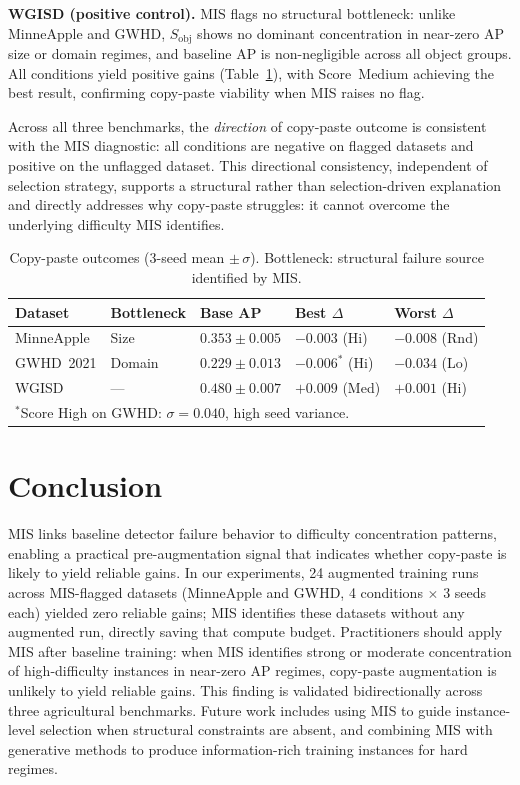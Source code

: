 \documentclass[conference]{IEEEtran}
\begin{document}
\textbf{WGISD (positive control).}
MIS flags no structural bottleneck: unlike MinneApple
and GWHD, $S_{\mathrm{obj}}$ shows no dominant
concentration in near-zero AP size or domain regimes,
and baseline AP is non-negligible across all object groups.
All conditions yield positive gains (Table~\ref{tab:outcomes}), 
with Score~Medium achieving
the best result, confirming copy-paste viability
when MIS raises no flag.

Across all three benchmarks, the \emph{direction} of
copy-paste outcome is consistent with the MIS diagnostic:
all conditions are negative on flagged datasets and
positive on the unflagged dataset.
This directional consistency, independent of selection
strategy, supports a structural rather than
selection-driven explanation and directly addresses
why copy-paste struggles: it cannot overcome the
underlying difficulty MIS identifies.

\begin{table}[t]
\centering
\caption{Copy-paste outcomes (3-seed mean $\pm\,\sigma$).
Bottleneck: structural failure source identified by MIS.}
\label{tab:outcomes}
\footnotesize
\setlength{\tabcolsep}{2.5pt}
\renewcommand{\arraystretch}{0.95}
\begin{tabular}{lllll}
\toprule
\textbf{Dataset}
  & \textbf{Bottleneck}
  & \textbf{Base AP}
  & \textbf{Best $\Delta$}
  & \textbf{Worst $\Delta$} \\
\midrule
MinneApple
  & Size
  & $0.353\pm0.005$
  & $-0.003$ (Hi)
  & $-0.008$ (Rnd) \\
GWHD~2021
  & Domain
  & $0.229\pm0.013$
  & $-0.006^{*}$ (Hi)
  & $-0.034$ (Lo) \\
WGISD
  & ---
  & $0.480\pm0.007$
  & $+0.009$ (Med)
  & $+0.001$ (Hi) \\
\bottomrule
\multicolumn{5}{l}{\scriptsize
  $^*$Score High on GWHD: $\sigma{=}0.040$, high seed variance.}
\end{tabular}
\end{table}


\section{Conclusion}

MIS links baseline detector failure behavior to difficulty 
concentration patterns, enabling a 
practical pre-augmentation signal that indicates whether 
copy-paste is likely to yield reliable gains.
In our experiments, 24 augmented training runs across MIS-flagged
datasets (MinneApple and GWHD, 4 conditions $\times$ 3 seeds each)
yielded zero reliable gains; MIS identifies these datasets without
any augmented run, directly saving that compute budget.
Practitioners should apply MIS after baseline training:
when MIS identifies strong or moderate concentration of 
high-difficulty instances in near-zero AP regimes, copy-paste augmentation 
is unlikely to yield reliable gains.
This finding is validated bidirectionally across three agricultural
benchmarks.
Future work includes using MIS to guide instance-level selection
when structural constraints are absent, and combining MIS with
generative methods to produce information-rich training instances
for hard regimes.
\end{document}
